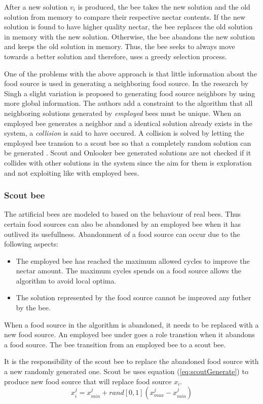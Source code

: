 After a new solution $v_i$ is produced, the bee takes the new solution and the old solution from memory to compare their respective nectar contents. If the new solution is found to have higher quality nectar, the bee replaces the old solution in memory with the new solution. Otherwise, the bee abandons the new solution and keeps the old solution in memory. Thus, the bee seeks to always move towards a better solution and therefore, uses a greedy selection process.

One of the problems with the above approach is that little information about the food source is used in generating a neighboring food source. In the research by Singh \cite{ABCLeafConstrained} a slight variation is proposed to generating food source neighbors by using more global information. The authors add a constraint to the algorithm that all neighboring solutions generated by \emph{employed} bees must be unique. When an employed bee generates a neighbor and a identical solution already exists in the system, a \emph{collision} is said to have occured. A collision is solved by letting the employed bee transion to a scout bee so that a completely random solution can be generated \cite{ABCLeafConstrained}. Scout and Onlooker bee generated solutions are not checked if it collides with other solutions in the system since the aim for them is exploration and not exploiting like with employed bees. 
\subsubsection{Scout bee}
The artificial bees are modeled to based on the behaviour of real bees. Thus certain food sources can also be abandoned by an employed bee when it has outlived its usefullness. Abandonment of a food source can occur due to the following aspects:
\begin{itemize}
\item The employed bee has reached the maximum allowed cycles to improve the nectar amount. The maximum cycles spends on a food source allows the algorithm to avoid local optima.
\item The solution represented by the food source cannot be improved any futher by the bee.
\end{itemize}
When a food source in the algorithm is abandoned, it needs to be replaced with a new food source. An employed bee under goes a role transtion when it abandons a food source. The bee transition from an employed bee to a scout bee. 

It is the responsibility of the scout bee to replace the abandoned food source with a new randomly generated one. Scout be uses equation (\ref{eq:scoutGenerate}) to produce new food source that will replace food source $x_i$.
\begin{equation}
\label{eq:scoutGenerate}
x^j_i = x^j_{min} + rand[0,1](x^j_{max} - x^j_{min})
\end{equation}

